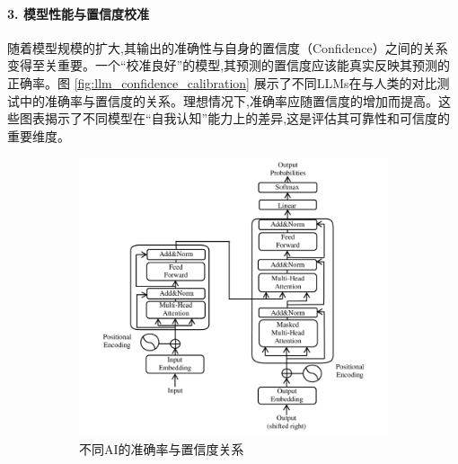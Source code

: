 \paragraph{3. 模型性能与置信度校准}
随着模型规模的扩大,其输出的准确性与自身的置信度（Confidence）之间的关系变得至关重要。一个“校准良好”的模型,其预测的置信度应该能真实反映其预测的正确率。图 \ref{fig:llm_confidence_calibration} 展示了不同LLMs在与人类的对比测试中的准确率与置信度的关系。理想情况下,准确率应随置信度的增加而提高。这些图表揭示了不同模型在“自我认知”能力上的差异,这是评估其可靠性和可信度的重要维度。
\begin{figure}[H]
    \centering
    \begin{subfigure}[b]{0.48\textwidth}
        \centering
        \includegraphics[width=\textwidth]{figures/LLM3.png}
        \caption{不同AI的准确率与置信度关系}
        \label{fig:llm_accuracy_confidence}
    \end{subfigure}
    \hfill
    \begin{subfigure}[b]{0.48\textwidth}
        \centering

\end{subfigure}
\end{figure}
